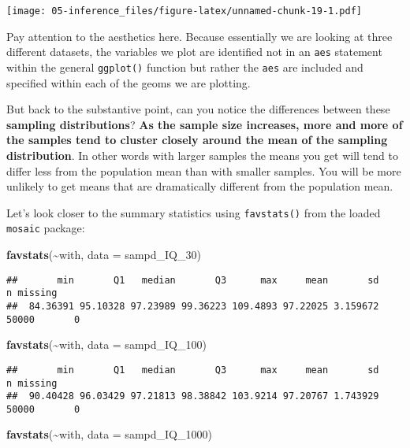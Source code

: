\documentclass[
]{book}
\newenvironment{Shaded}{\begin{snugshade}}{\end{snugshade}}
\newcommand{\AttributeTok}[1]{\textcolor[rgb]{0.13,0.29,0.53}{#1}}
\newcommand{\FunctionTok}[1]{\textcolor[rgb]{0.13,0.29,0.53}{\textbf{#1}}}
\newcommand{\NormalTok}[1]{#1}
\newcommand{\SpecialCharTok}[1]{\textcolor[rgb]{0.81,0.36,0.00}{\textbf{#1}}}
\begin{document}
\texttt{[image: 05-inference\_files/figure-latex/unnamed-chunk-19-1.pdf]}

Pay attention to the aesthetics here. Because essentially we are looking at three different datasets, the variables we plot are identified not in an \texttt{aes} statement within the general \texttt{ggplot()} function but rather the \texttt{aes} are included and specified within each of the geoms we are plotting.

But back to the substantive point, can you notice the differences between these \textbf{sampling distributions}? \textbf{As the sample size increases, more and more of the samples tend to cluster closely around the mean of the sampling distribution}. In other words with larger samples the means you get will tend to differ less from the population mean than with smaller samples. You will be more unlikely to get means that are dramatically different from the population mean.

Let's look closer to the summary statistics using \texttt{favstats()} from the loaded \texttt{mosaic} package:

\begin{Shaded}
\begin{Highlighting}[]
\FunctionTok{favstats}\NormalTok{(}\SpecialCharTok{\textasciitilde{}}\NormalTok{with, }\AttributeTok{data =}\NormalTok{ sampd\_IQ\_30)}
\end{Highlighting}
\end{Shaded}

\begin{verbatim}
##       min       Q1   median       Q3      max     mean       sd     n missing
##  84.36391 95.10328 97.23989 99.36223 109.4893 97.22025 3.159672 50000       0
\end{verbatim}

\begin{Shaded}
\begin{Highlighting}[]
\FunctionTok{favstats}\NormalTok{(}\SpecialCharTok{\textasciitilde{}}\NormalTok{with, }\AttributeTok{data =}\NormalTok{ sampd\_IQ\_100)}
\end{Highlighting}
\end{Shaded}

\begin{verbatim}
##       min       Q1   median       Q3      max     mean       sd     n missing
##  90.40428 96.03429 97.21813 98.38842 103.9214 97.20767 1.743929 50000       0
\end{verbatim}

\begin{Shaded}
\begin{Highlighting}[]
\FunctionTok{favstats}\NormalTok{(}\SpecialCharTok{\textasciitilde{}}\NormalTok{with, }\AttributeTok{data =}\NormalTok{ sampd\_IQ\_1000)}
\end{Highlighting}
\end{Shaded}
\end{document}
